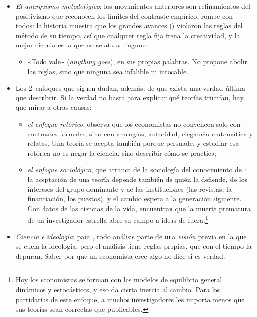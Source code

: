 \documentclass[11pt]{article}
\begin{document}
\begin{itemize}
\item \emph{El anarquismo metodológico}: los movimientos anteriores son refinamientos del positivismo que reconocen los límites del contraste empírico. \textcite{Feyerabend1975Against} rompe con todos: la historia muestra que los grandes avances () violaron las reglas del método de su tiempo, así que cualquier regla fija frena la creatividad, y la mejor ciencia es la que no se ata a ninguna.
  \begin{itemize}
  \item «Todo vale» (\emph{anything goes}), en sus propias palabras. No propone abolir las reglas, sino que ninguna sea infalible ni intocable.
  \end{itemize}
\item Los 2~enfoques que siguen dudan, además, de que exista una verdad última que descubrir. Si la verdad no basta para explicar qué teorías triunfan, hay que mirar a otras causas:
  \begin{itemize}
  \item \emph{el enfoque retórico}:  \parencite*{McCloskey1983Rhetoric} observa que los economistas no convencen solo con contrastes formales, sino con analogías, autoridad, elegancia matemática y relatos. Una teoría se acepta también porque persuade, y estudiar esa retórica no es negar la ciencia, sino describir cómo se practica;
  \item \emph{el enfoque sociológico}, que arranca de la sociología del conocimiento de  \parencite*{Mannheim1929Ideologie}: la aceptación de una teoría depende también de quién la defiende, de los intereses del grupo dominante y de las instituciones (las revistas, la financiación, los puestos), y el cambio espera a la generación siguiente. Con datos de las ciencias de la vida, \textcite{AzoulayFonsRosenGraffZivin2019} encuentran que la muerte prematura de un investigador estrella abre su campo a ideas de fuera.\footnote{Hoy los economistas se forman con los modelos de equilibrio general dinámicos y estocásticos, y eso da cierta inercia al cambio. Para los partidarios de este enfoque, a muchos investigadores les importa menos que sus teorías sean correctas que publicables.}
  \end{itemize}
\item \emph{Ciencia e ideología}: para \textcite{Schumpeter1949Science}, todo análisis parte de una \emph{visión} previa en la que se cuela la ideología, pero el análisis tiene reglas propias, que con el tiempo la depuran. Saber por qué un economista cree algo no dice si es verdad.
\end{itemize}
\end{document}
